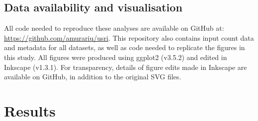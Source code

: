 \documentclass[10pt,letterpaper]{article}
\newlength\savedwidth
\newcommand\thickhline{\noalign{\global\savedwidth\arrayrulewidth\global\arrayrulewidth 2pt}%
\hline
\noalign{\global\arrayrulewidth\savedwidth}}
\providecommand{\DIFdelend}{} %
\DeclareRobustCommand{\DIFdelend}{\DIFOaddend \let\includegraphics\DIFOincludegraphics} %
\begin{document}
\DIFdelend \subsection*{Data availability and visualisation}
All code needed to reproduce these analyses are available on GitHub at: \url{https://github.com/amurariu/usri}. This repository also contains input count data and metadata for all datasets, as well as code needed to replicate the figures in this study. All figures were produced using ggplot2 (v3.5.2) \cite{wickham_ggplot_2016} and edited in Inkscape (v1.3.1). For transparency, details of figure edits made in Inkscape are available on GitHub, in addition to the original SVG files.





\section*{Results}

\end{document}
